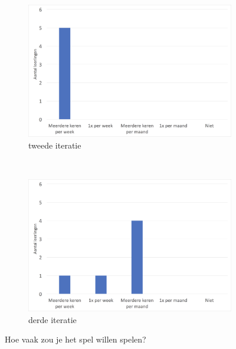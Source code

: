 \documentclass[11pt]{article}
\begin{document}
\begin{figure}
	\centering
    \begin{subfigure}[b]{0.48\textwidth}
        \includegraphics[width=\textwidth]{pictures/2_AantalSpelen.png}
        \caption{tweede iteratie}
        \label{aantal:spelen:twee}
    \end{subfigure}
    ~
    \begin{subfigure}[b]{0.48\textwidth}
        \includegraphics[width=\textwidth]{pictures/3_AantalSpelen.png}
        \caption{derde iteratie}
        \label{aantal:spelen:drie}
    \end{subfigure}
    \caption{Hoe vaak zou je het spel willen spelen?}\label{aantal:spelen}
\end{figure}
\end{document}
